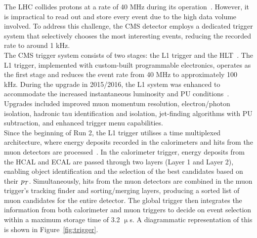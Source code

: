 The \ac{LHC} collides protons at a rate of 40 MHz during its operation~\cite{Evans:2008zzb}. 
However, it is impractical to read out and store every event due to the high data volume involved. 
To address this challenge, the \ac{CMS} detector employs a dedicated trigger system that selectively chooses the most interesting events, reducing the recorded rate to around 1 kHz. \\

The \ac{CMS} trigger system consists of two stages: the \ac{L1} trigger and the \ac{HLT}~\cite{CMS_Setup,CMS_trigger,Tapper:2013yva}. 
The \ac{L1} trigger, implemented with custom-built programmable electronics, operates as the first stage and reduces the event rate from 40 MHz to approximately 100 kHz. 
During the upgrade in 2015/2016, the \ac{L1} system was enhanced to accommodate the increased instantaneous luminosity and \ac{PU} conditions~\cite{Tapper:2013yva}. 
Upgrades included improved muon momentum resolution, electron/photon isolation, hadronic tau identification and isolation, jet-finding algorithms with \ac{PU} subtraction, and enhanced trigger menu capabilities. \\

Since the beginning of Run 2, the \ac{L1} trigger utilises a time multiplexed architecture, where energy deposits recorded in the calorimeters and hits from the muon detectors are processed~\cite{Tapper:2013yva}. 
In the calorimeter trigger, energy deposits from the \ac{HCAL} and \ac{ECAL} are passed through two layers (Layer 1 and Layer 2), enabling object identification and the selection of the best candidates based on their $p_{T}$. 
Simultaneously, hits from the muon detectors are combined in the muon trigger's tracking finder and sorting/merging layers, producing a sorted list of muon candidates for the entire detector. 
The global trigger then integrates the information from both calorimeter and muon triggers to decide on event selection within a maximum storage time of 3.2 $\upmu$s.
A diagrammatic representation of this is shown in Figure~\ref{fig:trigger}. \\

